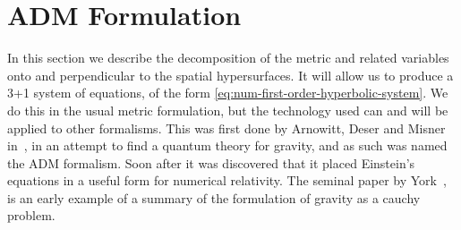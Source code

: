 \documentclass[10pt]{report}
\theoremstyle{definition}
\begin{document}
\section{ADM Formulation} \label{sec:numiercal-adm-formulation}

In this section we describe the decomposition of the metric and related variables onto and perpendicular to the spatial hypersurfaces. It will allow us to produce a 3+1 system of equations, of the form \cref{eq:num-first-order-hyperbolic-system}. We do this in the usual metric formulation, but the technology used can and will be applied to other formalisms. This was first done by  Arnowitt, Deser and Misner in~\cite{Canonical_Varia_Arnowi_1960}, in an attempt to find a quantum theory for gravity, and as such was named the ADM formalism. Soon after it was discovered that it placed Einstein's equations in a useful form for numerical relativity. The seminal paper by York~\cite{York:1978gql}, is an early example of a summary of the formulation of gravity as a cauchy problem.
\end{document}
